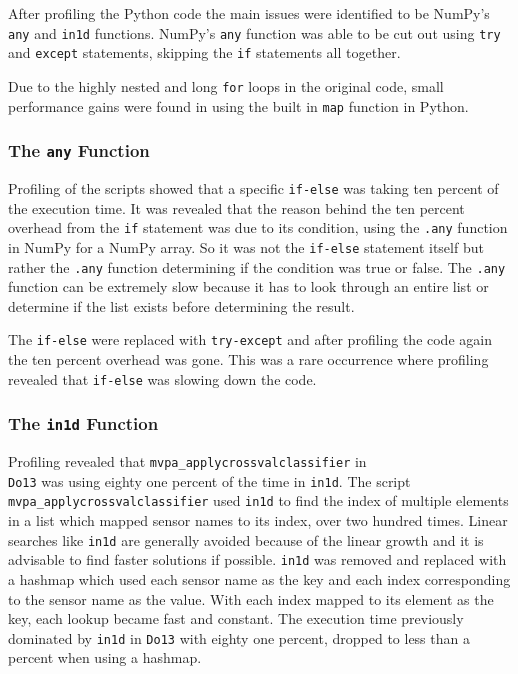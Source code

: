 \documentclass[12pt, a4paper]{article}
\begin{document}
After profiling the Python code the main issues were identified to be NumPy's \texttt{any} and \texttt{in1d} functions.
NumPy's \texttt{any} function was able to be cut out using \texttt{try} and \texttt{except} statements, skipping the \texttt{if} statements all together.%

Due to the highly nested and long \texttt{for} loops in the original code, small performance gains were found in using the built in \texttt{map} function in Python.

\subsubsection{The \texttt{any} Function}\label{metodAny}

Profiling of the scripts showed that a specific \texttt{if-else} was taking ten percent of the execution time.
It was revealed that the reason behind the ten percent overhead from the \texttt{if} statement was due to its condition, using the \texttt{.any} function in NumPy for a NumPy array.
So it was not the \texttt{if-else} statement itself but rather the \texttt{.any} function determining if the condition was true or false.
The \texttt{.any} function can be extremely slow because it has to look through an entire list or determine if the list exists before determining the result.

The \texttt{if-else} were replaced with \texttt{try-except} and after profiling the code again the ten percent overhead was gone.
This was a rare occurrence where profiling revealed that \texttt{if-else} was slowing down the code.

\subsubsection{The \texttt{in1d} Function}

Profiling revealed that \texttt{mvpa\_applycrossvalclassifier} in \\\texttt{Do13} was using eighty one percent of the time in \texttt{in1d}.
The script \texttt{mvpa\_applycrossvalclassifier} used \texttt{in1d} to find the index of multiple elements in a list which mapped sensor names to its index, over two hundred times.
Linear searches like \texttt{in1d} are generally avoided because of the linear growth and it is advisable to find faster solutions if possible.
\texttt{in1d} was removed and replaced with a hashmap which used each sensor name as the key and each index corresponding to the sensor name as the value.
With each index mapped to its element as the key, each lookup became fast and constant.
The execution time previously dominated by \texttt{in1d} in \texttt{Do13} with eighty one percent, dropped to less than a percent when using a hashmap.
\end{document}
